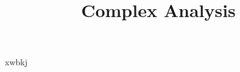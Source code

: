 \documentclass{lecture-preamble}
\title{Complex Analysis}
\begin{document}
\maketitle
\tableofcontents
\newpage

xwbkj
\lipsum
\lipsum
\end{document}
